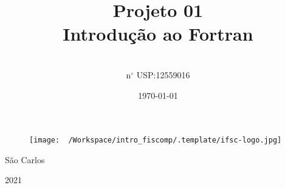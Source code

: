 \documentclass[11pt]{article}
\author{\textbf{\Lage{Jefter Santiago Mares}} \\ n\(^{\circ}\) USP:12559016}
\date{\today}
\title{\textbf{\Huge{Projeto 01}}\\\medskip
\large \huge{Introdução ao Fortran}}
\begin{document}
\maketitle
\setcounter{tocdepth}{2}
\tableofcontents

\begin{latex}
\begin{figure}[t!]
    \texttt{[image: ~/Workspace/intro\_fiscomp/.template/ifsc-logo.jpg]}
\end{figure}
\end{latex}

\thispagestyle{empty}
\vspace*{\fill}
\begin{center}
São Carlos

2021
\end{center}
\newpage
\end{document}
